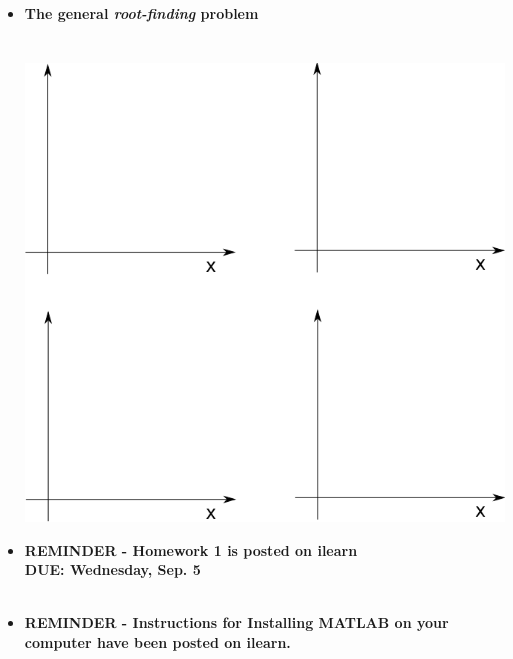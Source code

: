 \documentclass[11pt]{article}
\begin{document}
\begin{itemize}
	\item \textbf{ \LARGE The general {\it root-finding} problem }\\\\\\
	\includegraphics[scale=.6]{lecture1_fig2.png}
	\newpage 

	\item \textbf{ \LARGE REMINDER - Homework 1 is posted on ilearn } \\
	
	 \textbf{ \LARGE DUE: Wednesday, Sep. 5}	\\\\

	\item \textbf{ \LARGE REMINDER - Instructions for Installing MATLAB on your computer have been posted on ilearn. } \\
	

\end{itemize}


	
\end{document}
